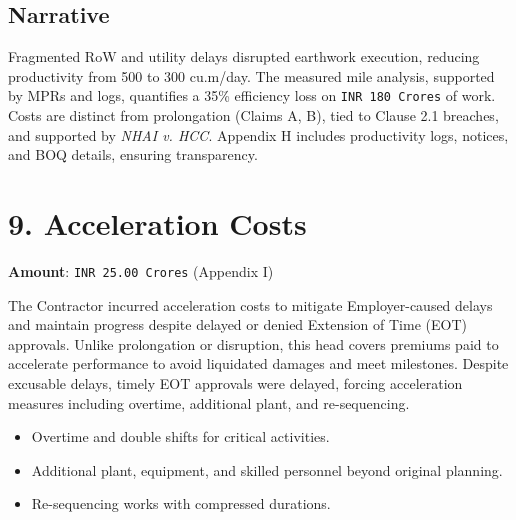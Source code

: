 \documentclass[12pt,letterpaper]{article}
\begin{document}
	\subsection*{Narrative}
	Fragmented RoW and utility delays disrupted earthwork execution, reducing productivity from 500 to 300 cu.m/day. The measured mile analysis, supported by MPRs and logs, quantifies a 35\% efficiency loss on \texttt{INR 180 Crores} of work. Costs are distinct from prolongation (Claims A, B), tied to Clause 2.1 breaches, and supported by \textit{NHAI v. HCC}. Appendix H includes productivity logs, notices, and BOQ details, ensuring transparency.
	
	\section*{9. Acceleration Costs}
	\textbf{Amount}: \texttt{INR 25.00 Crores} (Appendix I)
	
	The Contractor incurred acceleration costs to mitigate Employer-caused delays and maintain progress despite delayed or denied Extension of Time (EOT) approvals. Unlike prolongation or disruption, this head covers premiums paid to accelerate performance to avoid liquidated damages and meet milestones. Despite excusable delays, timely EOT approvals were delayed, forcing acceleration measures including overtime, additional plant, and re-sequencing.
	
	\begin{itemize}
		\item Overtime and double shifts for critical activities.
		\item Additional plant, equipment, and skilled personnel beyond original planning.
		\item Re-sequencing works with compressed durations.
	\end{itemize}
	
\end{document}
